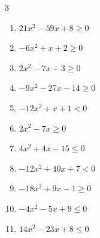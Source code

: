 \begin{multicols}{3}
\begin{enumerate}

  \item $21x^{2}-59x+8\geq 0$


  \item $-6x^{2}+x+2\geq 0$


\columnbreak %

\resetques

  \item $2x^{2}-7x+3\geq 0$


  \item $-9x^{2}-27x-14\geq 0$


  \item $-12x^{2}+x+1<0$


  \item $2x^{2}-7x\geq 0$


  \item $4x^{2}+4x-15\leq 0$


  \item $-12x^{2}+40x+7<0$


  \item $-18x^{2}+9x-1\geq 0$


  \item $-4x^{2}-5x+9\leq 0$


  \item $14x^{2}-23x+8\leq 0$



\end{enumerate}
\end{multicols}
